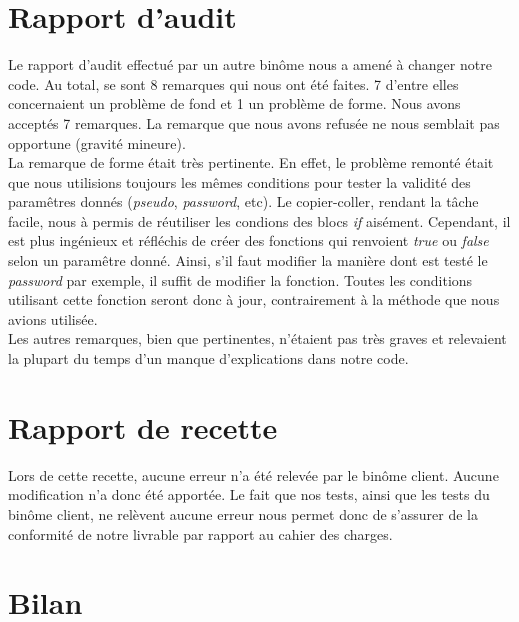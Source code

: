 \documentclass[12pt,a4paper]{report}
\begin{document}
\chapter*{Rapport d'audit}
\label{chapter:Rapport d'audit} %
Le rapport d'audit effectué par un autre binôme nous a amené à changer notre code. Au total, se sont 8 remarques qui nous ont été faites. 7 d'entre elles concernaient un problème de fond et 1 un problème de forme. Nous avons acceptés 7 remarques. La remarque que nous avons refusée ne nous semblait pas opportune (gravité mineure). \\

La remarque de forme était très pertinente. En effet, le problème remonté était que nous utilisions toujours les mêmes conditions pour tester la validité des paramêtres donnés (\emph{pseudo}, \emph{password}, etc). Le copier-coller, rendant la tâche facile, nous à permis de réutiliser les condions des blocs \emph{if} aisément. Cependant, il est plus ingénieux et réfléchis de créer des fonctions qui renvoient \emph{true} ou \emph{false} selon un paramêtre donné. Ainsi, s'il faut modifier la manière dont est testé le \emph{password} par exemple, il suffit de modifier la fonction. Toutes les conditions utilisant cette fonction seront donc à jour, contrairement à la méthode que nous avions utilisée.\\

Les autres remarques, bien que pertinentes, n'étaient pas très graves et relevaient la plupart du temps d'un manque d'explications dans notre code.

\chapter*{Rapport de recette}
\label{chapter:Rapport de recette} %
Lors de cette recette, aucune erreur n'a été relevée par le binôme client. Aucune modification n'a donc été apportée. Le fait que nos tests, ainsi que les tests du binôme client, ne relèvent aucune erreur nous permet donc de s'assurer de la conformité de notre livrable par rapport au cahier des charges.

\chapter*{Bilan}
\label{chapter:Bilan} %
\end{document}
